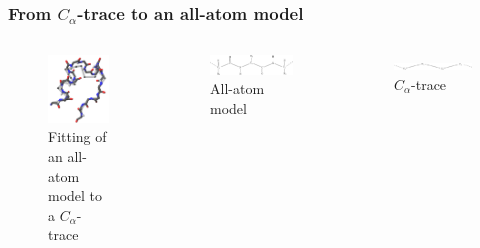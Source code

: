 \documentclass{beamer}
\begin{document}
\begin{frame}[t, fragile]
  \frametitle{From $C_\alpha$-trace to an all-atom model}
  \begin{columns}
    \column{5cm}
  \begin{figure}
    \centering
    \includegraphics[width=\textwidth]{../rapport/figures/forside.png}
    \caption{Fitting of an all-atom model to a $C_\alpha$-trace}
    \label{fig:front}
  \end{figure}

  \column{5cm}

  \begin{figure}
    \centering
    \includegraphics[width=\textwidth]{../rapport/figures/amino_connect.pdf}
    \caption{All-atom model}
    \label{fig:front}
  \end{figure}

  \begin{figure}
    \centering
    \includegraphics[width=\textwidth]{../rapport/figures/Calpha_backbone.pdf}
    \caption{$C_\alpha$-trace}
    \label{fig:front}
  \end{figure}
  \end{columns}
\end{frame}
\end{document}
